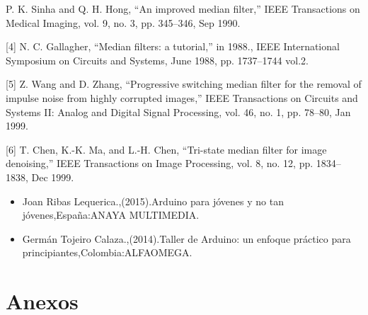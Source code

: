 \documentclass[10pt,a4paper]{article}
\begin{document}
\begin{multicols}{2}
\begin{itemize}
[3] P. K. Sinha and Q. H. Hong, “An improved median filter,” IEEE Transactions on Medical Imaging, vol. 9, no. 3, pp. 345–346, Sep 1990.

[4] N. C. Gallagher, “Median filters: a tutorial,” in 1988., IEEE International Symposium on Circuits and Systems, June 1988, pp. 1737–1744 vol.2.

[5] Z. Wang and D. Zhang, “Progressive switching median filter for the removal of impulse noise from highly corrupted images,” IEEE Transactions on Circuits and Systems II: Analog and Digital Signal Processing, vol. 46, no. 1, pp. 78–80, Jan 1999.

[6] T. Chen, K.-K. Ma, and L.-H. Chen, “Tri-state median filter for image denoising,” IEEE Transactions on Image Processing, vol. 8, no. 12, pp. 1834–1838, Dec 1999.





\begin{itemize}
\item Joan Ribas Lequerica.,(2015).Arduino para jóvenes y no tan jóvenes,España:ANAYA MULTIMEDIA.
\item Germán Tojeiro Calaza.,(2014).Taller de Arduino: un enfoque práctico para principiantes,Colombia:ALFAOMEGA.
\end{itemize}

\section{Anexos}



\end{itemize}
\end{multicols}
\end{document}
